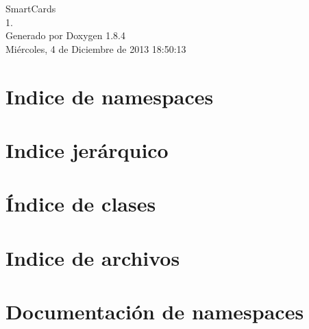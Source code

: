 \documentclass[twoside]{book}
\newcommand{\clearemptydoublepage}{%
  \newpage{\pagestyle{empty}\cleardoublepage}%
}
\begin{document}
\hypersetup{pageanchor=false}
\begin{titlepage}
\vspace*{7cm}
\begin{center}%
{\Large Smart\-Cards \\[1ex]\large 1. }\\
\vspace*{1cm}
{\large Generado por Doxygen 1.8.4}\\
\vspace*{0.5cm}
{\small Miércoles, 4 de Diciembre de 2013 18:50:13}\\
\end{center}
\end{titlepage}
\clearemptydoublepage
\tableofcontents
\clearemptydoublepage
{}
\hypersetup{pageanchor=true}

\chapter{Indice de namespaces}

\chapter{Indice jerárquico}

\chapter{Índice de clases}

\chapter{Indice de archivos}

\chapter{Documentación de namespaces}








\end{document}
